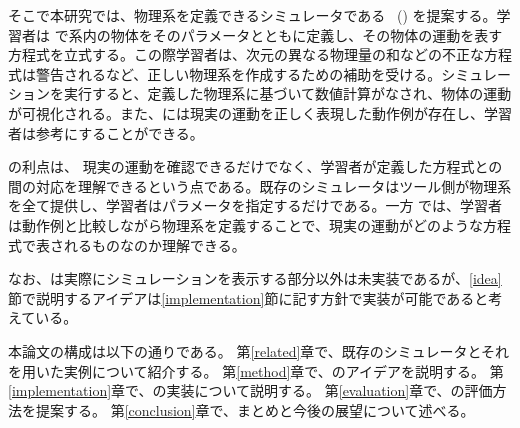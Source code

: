 そこで本研究では、物理系を定義できるシミュレータである \simname~(\simnamealt) を提案する。学習者は \simname で系内の物体をそのパラメータとともに定義し、その物体の運動を表す方程式を立式する。この際学習者は、次元の異なる物理量の和などの不正な方程式は警告されるなど、正しい物理系を作成するための補助を受ける。シミュレーションを実行すると、定義した物理系に基づいて数値計算がなされ、物体の運動が可視化される。また、\simname には現実の運動を正しく表現した動作例が存在し、学習者は参考にすることができる。

\simname の利点は、
現実の運動を確認できるだけでなく、学習者が定義した方程式との間の対応を理解できるという点である。既存のシミュレータはツール側が物理系を全て提供し、学習者はパラメータを指定するだけである。一方 \simname では、学習者は動作例と比較しながら物理系を定義することで、現実の運動がどのような方程式で表されるものなのか理解できる。

なお、\simname は実際にシミュレーションを表示する部分以外は未実装であるが、\ref{idea}節で説明するアイデアは\ref{implementation}節に記す方針で実装が可能であると考えている。

本論文の構成は以下の通りである。
第\ref{related}章で、既存のシミュレータとそれを用いた実例について紹介する。
第\ref{method}章で、\simname のアイデアを説明する。
第\ref{implementation}章で、\simname の実装について説明する。
第\ref{evaluation}章で、\simname の評価方法を提案する。
第\ref{conclusion}章で、まとめと今後の展望について述べる。
